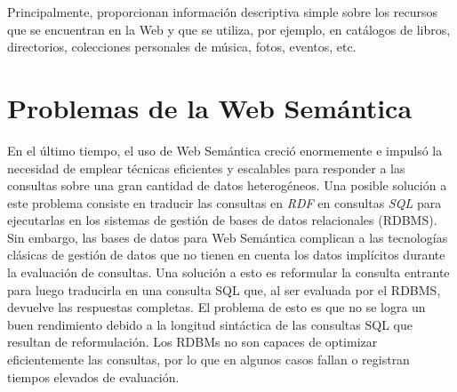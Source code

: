 \documentclass[10pt,a4paper]{article}
\begin{document}
Principalmente, proporcionan información descriptiva simple sobre los recursos que se encuentran en la Web y que se utiliza, por ejemplo, en catálogos de libros, directorios, colecciones personales de música, fotos, eventos, etc.

\section{Problemas de la Web Semántica}
En el último tiempo, el uso de Web Semántica creció enormemente e impulsó la necesidad de emplear técnicas eficientes y escalables para responder a las consultas sobre una gran cantidad de datos heterogéneos. Una posible solución a este problema consiste en traducir las consultas en \textit{RDF} en consultas \textit{SQL} para ejecutarlas en los sistemas de gestión de bases de datos relacionales (RDBMS). Sin embargo, las bases de datos para Web Semántica complican a las tecnologías clásicas de gestión de datos que no tienen en cuenta los datos implícitos durante la evaluación de consultas. Una solución a esto es reformular la consulta entrante para luego traducirla en una consulta SQL que, al ser evaluada por el RDBMS, devuelve las respuestas completas. El problema de esto es que no se logra un buen rendimiento debido a la longitud sintáctica de las consultas SQL que resultan de reformulación. Los RDBMs no son capaces de optimizar eficientemente las consultas, por lo que en algunos casos fallan o registran tiempos elevados de evaluación.

\end{document}
